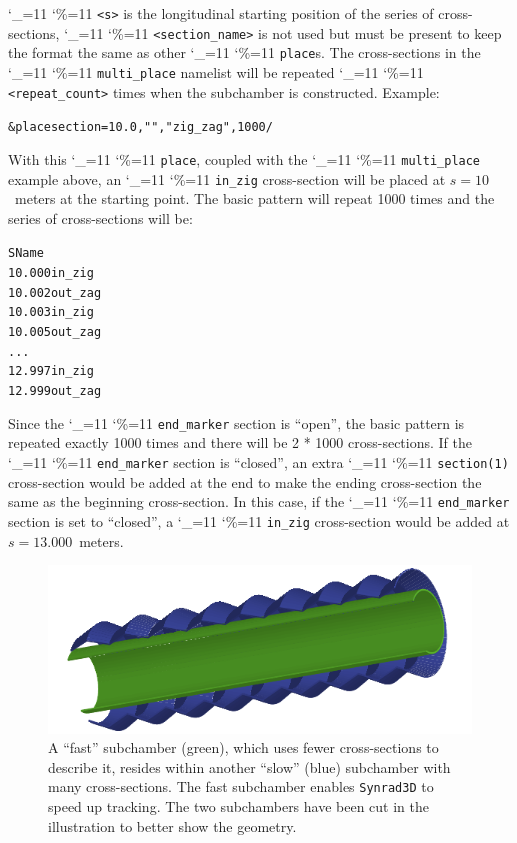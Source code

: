 \documentclass[11pt,openany]{report}
\newcommand{\srthree}{\texttt{Synrad3D}\xspace}
\newcommand\ttcmd{\begingroup\catcode`\_=11 \catcode`\%=11 \dottcmd}
\newcommand\dottcmd[1]{\texttt{#1}\endgroup}
\newcommand{\vn}{\ttcmd}
\newlength{\ExBeg}
\newlength{\ExEnd}
\newenvironment{example}
  {\vspace{\ExBeg} \begin{alltt}}
  {\end{alltt} \vspace{\ExEnd}}
\begin{document}
\vn{<s>} is the longitudinal starting position of the series of
cross-sections, \vn{<section_name>} is not used but must be present to
keep the format the same as other \vn{place}s. The cross-sections in the
\vn{multi_place} namelist will be repeated \vn{<repeat_count>}
times when the subchamber is constructed. Example:
\begin{example}
  &place section = 10.0, "", "zig_zag", 1000 /
\end{example}
With this \vn{place}, coupled with the \vn{multi_place}
example above, an \vn{in_zig} cross-section will be placed at $s =
10$~meters at the starting point. The basic pattern will repeat 1000
times and the series of cross-sections will be:
\begin{example}
     S       Name
  10.000     in_zig
  10.002     out_zag
  10.003     in_zig
  10.005     out_zag
  ...
  12.997     in_zig
  12.999     out_zag
\end{example}
Since the \vn{end_marker} section is ``open'', the basic pattern is
repeated exactly 1000 times and there will be 2 * 1000
cross-sections. If the \vn{end_marker} section is ``closed'', an extra
\vn{section(1)} cross-section would be added at the end to make the
ending cross-section the same as the beginning cross-section. In this
case, if the \vn{end_marker} section is set to ``closed'', a
\vn{in_zig} cross-section would be added at $s = 13.000$~meters.

  \begin{figure}
  \centering
  \includegraphics[width=6in]{fast-chamber.pdf}
  \caption[Illustrating a fast subchamber residing within another subchamber.]
{\label{f:fast} A ``fast'' subchamber (green), which uses fewer cross-sections to describe
it, resides within another ``slow'' (blue) subchamber with many cross-sections. The fast
subchamber enables \srthree to speed up tracking. The two subchambers have been cut in
the illustration to better show the geometry.}
  \end{figure}
\end{document}
